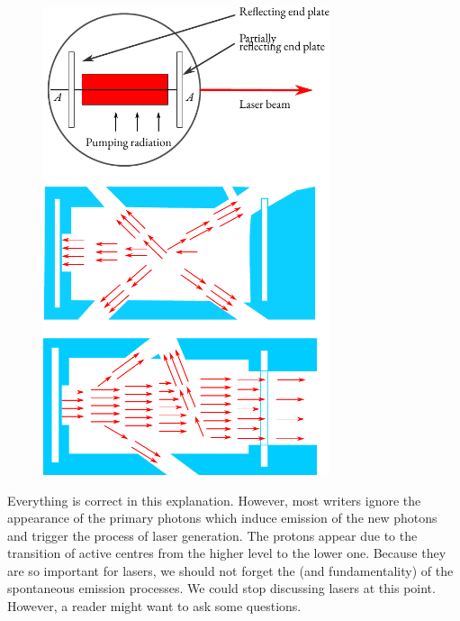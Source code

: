 \begin{figure}[!ht]
\centering
\includegraphics[width=0.75\textwidth]{figures/laser.pdf}
\end{figure}

Everything is correct in this explanation. However, most writers
ignore the appearance of the primary photons which induce emission of
the new photons and trigger the process of laser generation. The protons
appear due to the  transition of active centres from the
higher level to the lower one. Because they are so important for lasers,
we should not forget the  (and fundamentality) of the
spontaneous emission processes. We could stop discussing lasers at this
point. However, a reader might want to ask some questions.

